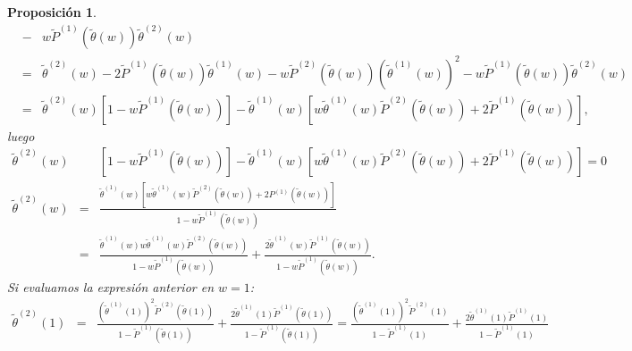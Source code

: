 \documentclass{article}
\newtheorem{Prop}{Proposición}[section]
\numberwithin{equation}{section}
\begin{document}
\begin{Prop}
\begin{eqnarray*}
&-&w\tilde{P}^{(1)}\left(\tilde{\theta}\left(w\right)\right)\tilde{\theta}^{(2)}\left(w\right)\\
&=&\tilde{\theta}^{(2)}\left(w\right)-2\tilde{P}^{(1)}\left(\tilde{\theta}\left(w\right)\right)\tilde{\theta}^{(1)}\left(w\right)-w\tilde{P}^{(2)}\left(\tilde{\theta}\left(w\right)\right)\left(\tilde{\theta}^{(1)}\left(w\right)\right)^{2}-w\tilde{P}^{(1)}\left(\tilde{\theta}\left(w\right)\right)\tilde{\theta}^{(2)}\left(w\right)\\
&=&\tilde{\theta}^{(2)}\left(w\right)\left[1-w\tilde{P}^{(1)}\left(\tilde{\theta}\left(w\right)\right)\right]-
\tilde{\theta}^{(1)}\left(w\right)\left[w\tilde{\theta}^{(1)}\left(w\right)\tilde{P}^{(2)}\left(\tilde{\theta}\left(w\right)\right)+2\tilde{P}^{(1)}\left(\tilde{\theta}\left(w\right)\right)\right],
\end{eqnarray*}
luego
\begin{eqnarray*}
\tilde{\theta}^{(2)}\left(w\right)&&\left[1-w\tilde{P}^{(1)}\left(\tilde{\theta}\left(w\right)\right)\right]-\tilde{\theta}^{(1)}\left(w\right)\left[w\tilde{\theta}^{(1)}\left(w\right)\tilde{P}^{(2)}\left(\tilde{\theta}\left(w\right)\right)+2\tilde{P}^{(1)}\left(\tilde{\theta}\left(w\right)\right)\right]=0\\
\tilde{\theta}^{(2)}\left(w\right)&=&\frac{\tilde{\theta}^{(1)}\left(w\right)\left[w\tilde{\theta}^{(1)}\left(w\right)\tilde{P}^{(2)}\left(\tilde{\theta}\left(w\right)\right)+2P^{(1)}\left(\tilde{\theta}\left(w\right)\right)\right]}{1-w\tilde{P}^{(1)}\left(\tilde{\theta}\left(w\right)\right)}\\
&=&\frac{\tilde{\theta}^{(1)}\left(w\right)w\tilde{\theta}^{(1)}\left(w\right)\tilde{P}^{(2)}\left(\tilde{\theta}\left(w\right)\right)}{1-w\tilde{P}^{(1)}\left(\tilde{\theta}\left(w\right)\right)}+\frac{2\tilde{\theta}^{(1)}\left(w\right)\tilde{P}^{(1)}\left(\tilde{\theta}\left(w\right)\right)}{1-w\tilde{P}^{(1)}\left(\tilde{\theta}\left(w\right)\right)}.
\end{eqnarray*}
Si evaluamos la expresi\'on anterior en $w=1$:
\begin{eqnarray*}
\tilde{\theta}^{(2)}\left(1\right)&=&\frac{\left(\tilde{\theta}^{(1)}\left(1\right)\right)^{2}\tilde{P}^{(2)}\left(\tilde{\theta}\left(1\right)\right)}{1-\tilde{P}^{(1)}\left(\tilde{\theta}\left(1\right)\right)}+\frac{2\tilde{\theta}^{(1)}\left(1\right)\tilde{P}^{(1)}\left(\tilde{\theta}\left(1\right)\right)}{1-\tilde{P}^{(1)}\left(\tilde{\theta}\left(1\right)\right)}=\frac{\left(\tilde{\theta}^{(1)}\left(1\right)\right)^{2}\tilde{P}^{(2)}\left(1\right)}{1-\tilde{P}^{(1)}\left(1\right)}+\frac{2\tilde{\theta}^{(1)}\left(1\right)\tilde{P}^{(1)}\left(1\right)}{1-\tilde{P}^{(1)}\left(1\right)}\\

\end{eqnarray*}
\end{Prop}
\end{document}
